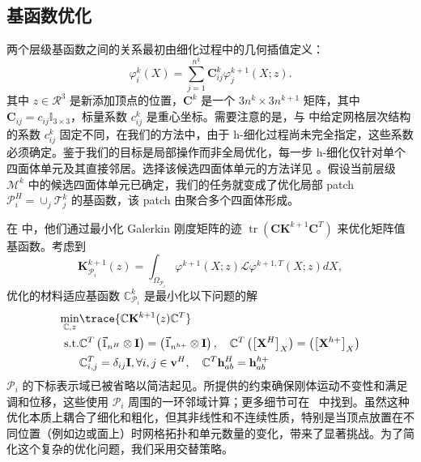 \subsection{基函数优化}

两个层级基函数之间的关系最初由细化过程中的几何插值定义：
\begin{equation}
  \varphi^k_i (X) = \sum_{j=1}^{n^k} \mathbf{C}_{ij}^k \varphi_{j}^{k+1}(X;z).
\end{equation}
其中 $z \in \mathcal{R}^3$ 是新添加顶点的位置，$\mathbf{C}^k$ 是一个 $3n^k \times 3 n^{k+1}$ 矩阵，其中 $\mathbf{C}_{ij} =
c_{ij}\mathbb{I}_{3\times3}$，标量系数 $c_{ij}^k$ 是重心坐标。需要注意的是，与 \cite{chen2019material} 中给定网格层次结构的系数 $c_{ij}^k$ 固定不同，在我们的方法中，由于 h-细化过程尚未完全指定，这些系数必须确定。鉴于我们的目标是局部操作而非全局优化，每一步 h-细化仅针对单个四面体单元及其直接邻居。选择该候选四面体单元的方法详见 。假设当前层级 $\mathcal{M}^k$ 中的候选四面体单元已确定，我们的任务就变成了优化局部 patch $\mathcal{P}_i^H = \cup_j\mathcal{T}^k_j$ 的基函数，该 patch 由聚合多个四面体形成。

在 \cite{chen2019material, chen2018numerical} 中，他们通过最小化 Galerkin 刚度矩阵的迹 $\operatorname{tr}\left(\mathbf{C} \mathbf{K}^{k+1} \mathbf{C}^T\right)$ 来优化矩阵值基函数。考虑到
\begin{equation}
  \mathbf{K}^{k+1}_{\mathcal{P}_i}(z) = \int_{\Omega_{\mathcal{P}_i}}\varphi^{k+1}(X;z) \mathcal{L} \varphi^{k+1, T}(X;z)  dX,
\end{equation}
优化的材料适应基函数 $\mathbb{C}^k_{\mathcal{P}_i}$ 是最小化以下问题的解
\begin{equation}
  \begin{split}
    \min_{\mathbb{C}, z} &\trace{\mathbb{C}  \mathbf{K}^{k+1} (z) \mathbb{C}^T}\\
    \text{s.t.}  &\mathbb{C}^T \left(\vec{1}_{n^H}  \otimes \mathbf{I} \right) = \left(\vec{1}_{n^{h+}} \otimes \mathbf{I} \right), \quad \mathbb{C}^T \left( \left[ \mathbf{X}^H \right]_X \right) =  \left( \left[ \mathbf{X}^{h+} \right]_X \right)\\
    &\mathbb{C}_{i,j}^T = \delta_{ij} \mathbf{I}, \forall i,j \in \mathbf{v}^H, \quad \mathbb{C}^T \mathbf{h}_{ab}^H = \mathbf{h}_{ab}^{h+}
  \end{split}
  \label{eq:opt_basis}
\end{equation}
$\mathcal{P}_i$ 的下标表示域已被省略以简洁起见。所提供的约束确保刚体运动不变性和满足调和位移，这些使用 $\mathcal{P}_i$ 周围的一环邻域计算；更多细节可在~\cite{chen2018numerical, heFast2023} 中找到。虽然这种优化本质上耦合了细化和粗化，但其非线性和不连续性质，特别是当顶点放置在不同位置（例如边或面上）时网格拓扑和单元数量的变化，带来了显著挑战。为了简化这个复杂的优化问题，我们采用交替策略。

